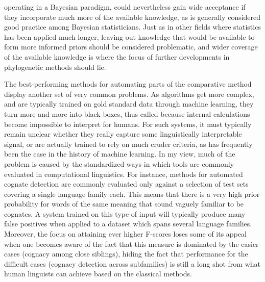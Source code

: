 operating in a Bayesian paradigm, could nevertheless gain wide acceptance if they incorporate much more of the available knowledge, as is generally considered good practice among Bayesian statisticians. Just as in other fields where statistics has been applied much longer, leaving out knowledge that would be available to form more informed priors should be considered problematic, and wider coverage of the available knowledge is where the focus of further developments in phylogenetic methods should lie.

The best-performing methods for automating parts of the comparative method display another set of very common problems. As algorithms get more complex, and are typically trained on gold standard data through machine learning, they turn more and more into black boxes, thus called because internal calculations become impossible to interpret for humans. For such systems, it must typically remain unclear whether they really capture some linguistically interpretable signal, or are actually trained to rely on much cruder criteria, as has frequently been the case in the history of machine learning. In my view, much of the problem is caused by the standardized ways in which tools are commonly evaluated in computational linguistics. For instance, methods for automated cognate detection are commonly evaluated only against a selection of test sets covering a single language family each. This means that there is a very high prior probability for words of the same meaning that sound vaguely familiar to be cognates. A system trained on this type of input will typically produce many false positives when applied to a dataset which spans several language families. Moreover, the focus on attaining ever higher F-scores loses some of its appeal when one becomes aware of the fact that this measure is dominated by the easier cases (cognacy among close siblings), hiding the fact that performance for the difficult cases (cognacy detection across subfamilies) is still a long shot from what human linguists can achieve based on the classical methods.

